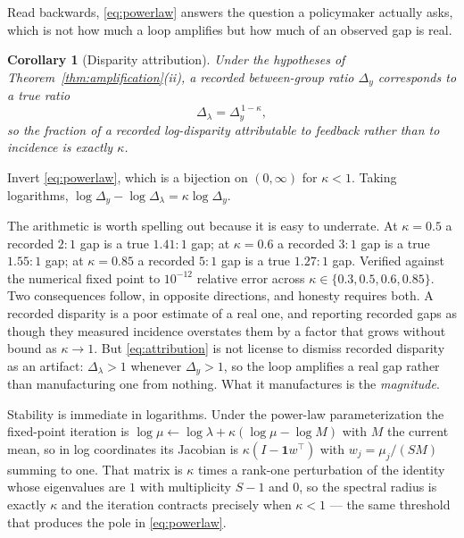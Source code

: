 \documentclass[journal,10pt,twocolumn]{IEEEtran}
\newtheorem{corollary}{Corollary}
\begin{document}
Read backwards, \eqref{eq:powerlaw} answers the question a policymaker actually
asks, which is not how much a loop amplifies but how much of an observed gap is
real.

\begin{corollary}[Disparity attribution]
\label{cor:attribution}
Under the hypotheses of Theorem~\ref{thm:amplification}(ii), a recorded
between-group ratio $\Delta_y$ corresponds to a true ratio
\begin{equation}
\label{eq:attribution}
\Delta_{\lambda} = \Delta_y^{\,1-\kappa},
\end{equation}
so the fraction of a recorded log-disparity attributable to feedback rather than
to incidence is exactly $\kappa$.
\end{corollary}

\begin{IEEEproof}
Invert \eqref{eq:powerlaw}, which is a bijection on $(0,\infty)$ for
$\kappa < 1$. Taking logarithms,
$\log\Delta_y - \log\Delta_{\lambda} = \kappa \log\Delta_y$.
\end{IEEEproof}

The arithmetic is worth spelling out because it is easy to underrate. At
$\kappa = 0.5$ a recorded $2{:}1$ gap is a true $1.41{:}1$ gap; at
$\kappa = 0.6$ a recorded $3{:}1$ gap is a true $1.55{:}1$ gap; at
$\kappa = 0.85$ a recorded $5{:}1$ gap is a true $1.27{:}1$ gap. Verified against
the numerical fixed point to $10^{-12}$ relative error across
$\kappa \in \{0.3, 0.5, 0.6, 0.85\}$. Two consequences follow, in opposite
directions, and honesty requires both. A recorded disparity is a poor estimate of
a real one, and reporting recorded gaps as though they measured incidence
overstates them by a factor that grows without bound as $\kappa \to 1$. But
\eqref{eq:attribution} is not license to dismiss recorded disparity as an
artifact: $\Delta_{\lambda} > 1$ whenever $\Delta_y > 1$, so the loop amplifies a
real gap rather than manufacturing one from nothing. What it manufactures is the
\emph{magnitude}.

Stability is immediate in logarithms. Under the power-law parameterization the
fixed-point iteration is
$\log\mu \leftarrow \log\lambda + \kappa(\log\mu - \log M)$ with $M$ the current
mean, so in log coordinates its Jacobian is
$\kappa\left(I - \mathbf{1}w^{\!\top}\right)$ with
$w_j = \mu_j / (S M)$ summing to one. That matrix is $\kappa$ times a rank-one
perturbation of the identity whose eigenvalues are $1$ with multiplicity $S-1$
and $0$, so the spectral radius is exactly $\kappa$ and the iteration contracts
precisely when $\kappa < 1$ --- the same threshold that produces the pole in
\eqref{eq:powerlaw}.
\end{document}
